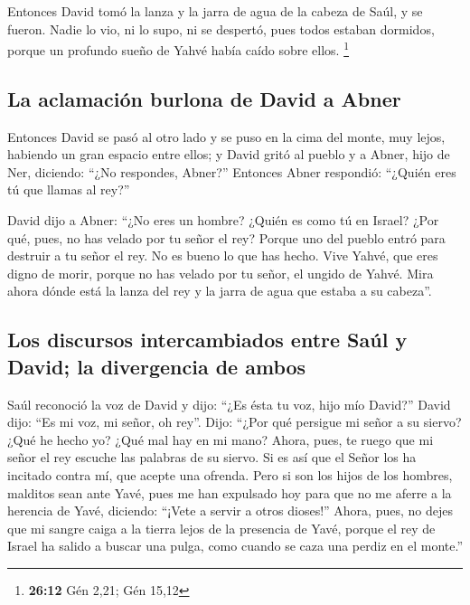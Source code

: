 \begin{paracol}{2}
 Entonces David tomó la lanza y la jarra de agua de la
cabeza de Saúl, y se fueron. Nadie lo vio, ni lo supo, ni se despertó,
pues todos estaban dormidos, porque un profundo sueño de Yahvé había
caído sobre ellos. \footnote{\textbf{26:12} Gén 2,21; Gén 15,12}

\hypertarget{la-aclamaciuxf3n-burlona-de-david-a-abner}{%
\subsection{La aclamación burlona de David a
Abner}\label{la-aclamaciuxf3n-burlona-de-david-a-abner}}

 Entonces David se pasó al otro lado y se puso en la cima
del monte, muy lejos, habiendo un gran espacio entre ellos;
 y David gritó al pueblo y a Abner, hijo de Ner,
diciendo: ``¿No respondes, Abner?'' Entonces Abner respondió: ``¿Quién
eres tú que llamas al rey?''

 David dijo a Abner: ``¿No eres un hombre? ¿Quién es como
tú en Israel? ¿Por qué, pues, no has velado por tu señor el rey? Porque
uno del pueblo entró para destruir a tu señor el rey.  No
es bueno lo que has hecho. Vive Yahvé, que eres digno de morir, porque
no has velado por tu señor, el ungido de Yahvé. Mira ahora dónde está la
lanza del rey y la jarra de agua que estaba a su cabeza''.

\hypertarget{los-discursos-intercambiados-entre-sauxfal-y-david-la-divergencia-de-ambos}{%
\subsection{Los discursos intercambiados entre Saúl y David; la
divergencia de
ambos}\label{los-discursos-intercambiados-entre-sauxfal-y-david-la-divergencia-de-ambos}}

 Saúl reconoció la voz de David y dijo: ``¿Es ésta tu
voz, hijo mío David?'' David dijo: ``Es mi voz, mi señor, oh rey''.
 Dijo: ``¿Por qué persigue mi señor a su siervo? ¿Qué he
hecho yo? ¿Qué mal hay en mi mano?  Ahora, pues, te ruego
que mi señor el rey escuche las palabras de su siervo. Si es así que el
Señor los ha incitado contra mí, que acepte una ofrenda. Pero si son los
hijos de los hombres, malditos sean ante Yavé, pues me han expulsado hoy
para que no me aferre a la herencia de Yavé, diciendo: ``¡Vete a servir
a otros dioses!''  Ahora, pues, no dejes que mi sangre
caiga a la tierra lejos de la presencia de Yavé, porque el rey de Israel
ha salido a buscar una pulga, como cuando se caza una perdiz en el
monte.''


\end{paracol}
